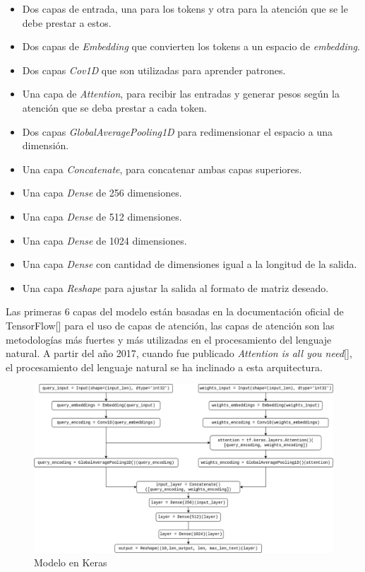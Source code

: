 \begin{itemize}
    \item Dos capas de entrada, una para los tokens y otra para la atención que se le debe prestar a estos.
    \item Dos capas de \textit{Embedding} que convierten los tokens a un espacio de \textit{embedding}.
    \item Dos capas \textit{Cov1D} que son utilizadas para aprender patrones.
    \item Una capa de \textit{Attention}, para recibir las entradas y generar pesos seg\'un la atenci\'on que se deba prestar a cada token.
    \item Dos capas \textit{GlobalAveragePooling1D} para redimensionar el espacio a una dimensión.
    \item Una capa \textit{Concatenate}, para concatenar ambas capas superiores.
    \item Una capa \textit{Dense} de 256 dimensiones.
    \item Una capa \textit{Dense} de 512 dimensiones.
    \item Una capa \textit{Dense} de 1024 dimensiones.
    \item Una capa \textit{Dense} con cantidad de dimensiones igual a la longitud de la salida.
    \item Una capa \textit{Reshape} para ajustar la salida al formato de matriz deseado.
\end{itemize}
Las primeras 6 capas del modelo están basadas en la documentación oficial de TensorFlow[\cite{tensorflow}] para el uso de capas de atención, las capas de atenci\'on son las metodolog\'ias m\'as fuertes y m\'as utilizadas en el procesamiento del lenguaje natural. A partir del a\~no 2017, cuando fue publicado \textit{Attention is all you need}[\cite{transformers}], el procesamiento del lenguaje natural se ha inclinado a esta arquitectura.

\begin{figure}[H]
\centering
 \includegraphics[width=\textwidth]{Graphics/model.png}
 \caption{Modelo en Keras}
 \label{fig:modelo}
\end{figure}

